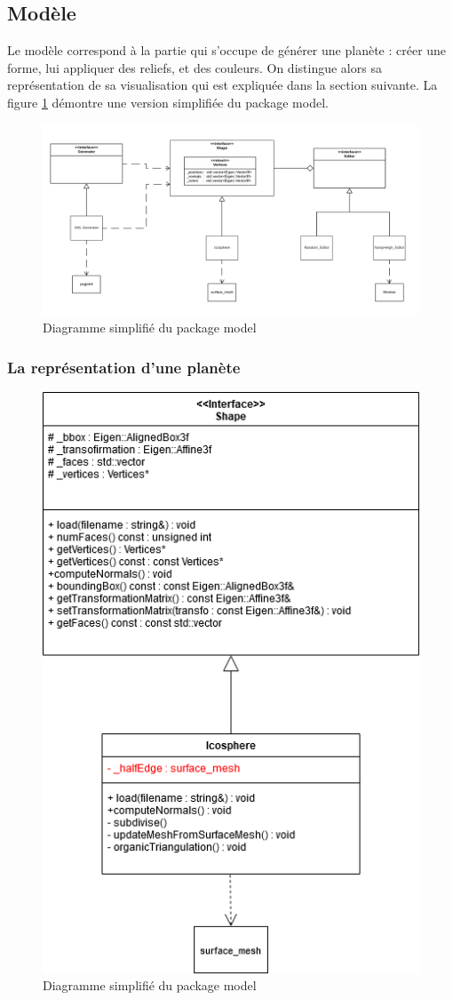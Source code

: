 \documentclass[a4paper]{article}
\begin{document}
\subsection{Modèle}
Le modèle correspond à la partie qui s'occupe de générer une planète : créer une forme, lui appliquer des reliefs, et des couleurs. On distingue alors sa représentation de sa visualisation qui est expliquée dans la section suivante. La figure \ref{archi_model} démontre une version simplifiée du package model.\\

 \begin{figure}[!h]
        \begin{center} \includegraphics[width=\linewidth]{img/archi/model.png}\end{center}
        \caption{\label{archi_model}Diagramme simplifié du package model}
    \end{figure}

\subsubsection{La représentation d'une planète}

 \begin{figure}[!h]
        \begin{center} \includegraphics[width=0.5\linewidth]{img/archi/model_shape.png}\end{center}
        \caption{\label{archi_shape}Diagramme simplifié du package model}
    \end{figure}
    
\end{document}
